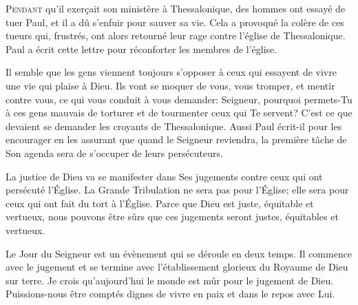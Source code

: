 
\lettrine{P}{endant} qu'il exer\c{c}ait son ministère à Thessalonique,
 des hommes ont essayé de tuer Paul, et il a dû s'enfuir pour sauver sa vie.
 Cela a provoqué la colère de ces tueurs qui, frustrés, ont alors retourné
 leur rage contre l'église de Thessalonique. Paul a écrit cette lettre
 pour réconforter les membres de l'église.

Il semble que les gens viennent toujours s'opposer à ceux qui essayent
 de vivre une vie qui plaise à Dieu. Ils vont se moquer de vous, vous tromper,
 et mentir contre vous, ce qui vous conduit à vous demander: 
 \Og Seigneur, pourquoi permets-Tu  à ces gens mauvais de torturer
 et de tourmenter ceux qui Te servent? \Fg{} 
 C'est ce que devaient se demander les croyants de Thessalonique.
 Aussi Paul écrit-il pour les encourager en les assurant que quand le Seigneur
 reviendra, la première tâche de Son agenda sera de s'occuper
 de leurs persécuteurs.


La justice de Dieu va se manifester dans Ses jugements contre ceux
 qui ont persécuté l'Église. La Grande Tribulation ne sera pas pour l'Église;
 elle sera pour ceux qui ont fait du tort à l'Église.
 Parce que Dieu est juste, équitable et vertueux, nous pouvons être sûrs
 que ces jugements seront justes, équitables et vertueux.

Le Jour du Seigneur est un évènement qui se déroule en
 deux temps. Il commence avec le jugement et se termine avec l'établissement
 glorieux du Royaume de Dieu sur terre. Je crois qu'aujourd'hui le monde
 est mûr pour le jugement de Dieu. Puissions-nous être comptés dignes de vivre
 en paix et dans le repos avec Lui.

\dvrule




